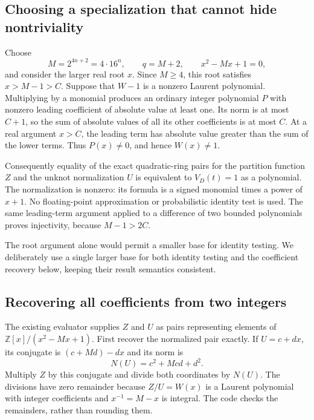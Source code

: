 \subsection{Choosing a specialization that cannot hide nontriviality}

Choose
\[
 M=2^{4n+2}=4\cdot16^n,\qquad q=M+2,\qquad x^2-Mx+1=0,
\]
and consider the larger real root $x$.  Since $M\ge4$, this root satisfies
$x>M-1>C$.  Suppose that $W-1$ is a nonzero Laurent polynomial.  Multiplying
by a monomial produces an ordinary integer polynomial $P$ with nonzero
leading coefficient of absolute value at least one.  Its norm is at most
$C+1$, so the sum of absolute values of all its other coefficients is at most
$C$.  At a real argument $x>C$, the leading term has absolute value greater
than the sum of the lower terms.  Thus $P(x)\ne0$, and hence $W(x)\ne1$.

Consequently equality of the exact quadratic-ring pairs for the partition
function $Z$ and the unknot normalization $U$ is equivalent to
$V_D(t)=1$ as a polynomial.  The normalization is nonzero: its formula is a
signed monomial times a power of $x+1$.  No floating-point approximation or
probabilistic identity test is used.  The same leading-term argument applied
to a difference of two bounded polynomials proves injectivity, because
$M-1>2C$.

The root argument alone would permit a smaller base for identity testing.
We deliberately use a single larger base for both identity testing and the
coefficient recovery below, keeping their result semantics consistent.

\subsection{Recovering all coefficients from two integers}

The existing evaluator supplies $Z$ and $U$ as pairs representing elements
of $\mathbb{Z}[x]/(x^2-Mx+1)$.  First recover the normalized pair exactly.
If $U=c+dx$, its conjugate is $(c+Md)-dx$ and its norm is
\[
 N(U)=c^2+Mcd+d^2.
\]
Multiply $Z$ by this conjugate and divide both coordinates by $N(U)$.
The divisions have zero remainder because $Z/U=W(x)$ is a Laurent
polynomial with integer coefficients and $x^{-1}=M-x$ is integral.
The code checks the remainders, rather than rounding them.

